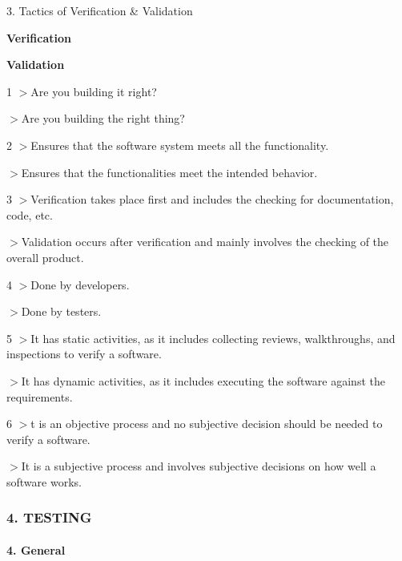 3. Tactics of Verification \& Validation

{\bfseries Verification}

{\bfseries Validation}

1 $>$Are you building it right?

$>$Are you building the right thing?

2 $>$Ensures that the software system meets all the functionality.

$>$Ensures that the functionalities meet the intended behavior.

3 $>$Verification takes place first and includes the checking for documentation, code, etc.

$>$Validation occurs after verification and mainly involves the checking of the overall product.

4 $>$Done by developers.

$>$Done by testers.

5 $>$It has static activities, as it includes collecting reviews, walkthroughs, and inspections to verify a software.

$>$It has dynamic activities, as it includes executing the software against the requirements.

6 $>$t is an objective process and no subjective decision should be needed to verify a software.

$>$It is a subjective process and involves subjective decisions on how well a software works.

\subsubsection*{4. T\+E\+S\+T\+I\+NG}

\paragraph*{4. General}


